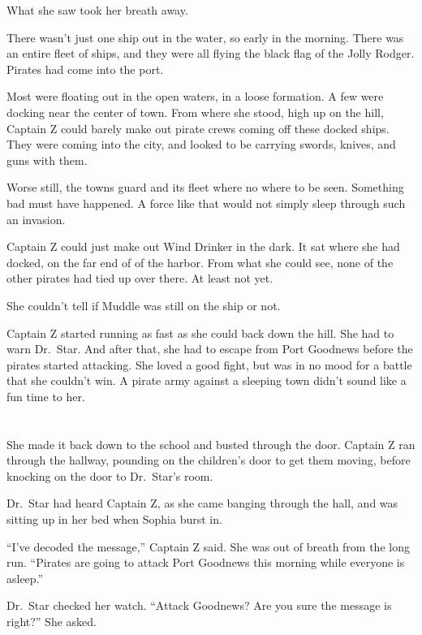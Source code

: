 \documentclass[12pt]{extbook}
\begin{document}
  What she saw took her breath away.
  
  There wasn't just one ship out in the water, so early in the morning.
  There was an entire fleet of ships, and they were all flying the black
  flag of the Jolly Rodger. Pirates had come into the port.
  
  Most were floating out in the open waters, in a loose formation. A few
  were docking near the center of town. From where she stood, high up on
  the hill, Captain Z could barely make out pirate crews coming off these
  docked ships. They were coming into the city, and looked to be carrying
  swords, knives, and guns with them.
  
  Worse still, the towns guard and its fleet where no where to be seen.
  Something bad must have happened. A force like that would not simply
  sleep through such an invasion.
  
  Captain Z could just make out Wind Drinker in the dark. It sat where she
  had docked, on the far end of of the harbor. From what she could see,
  none of the other pirates had tied up over there. At least not yet.
  
  She couldn't tell if Muddle was still on the ship or not.
  
  Captain Z started running as fast as she could back down the hill. She
  had to warn Dr.~Star. And after that, she had to escape from Port
  Goodnews before the pirates started attacking. She loved a good fight,
  but was in no mood for a battle that she couldn't win. A pirate army
  against a sleeping town didn't sound like a fun time to her.
  
  \section{}\label{section-33}
  
  She made it back down to the school and busted through the door. Captain
  Z ran through the hallway, pounding on the children's door to get them
  moving, before knocking on the door to Dr.~Star's room.
  
  Dr.~Star had heard Captain Z, as she came banging through the hall, and
  was sitting up in her bed when Sophia burst in.
  
  \enquote{I've decoded the message,} Captain Z said. She was out of
  breath from the long run. \enquote{Pirates are going to attack Port
  Goodnews this morning while everyone is asleep.}
  
  Dr.~Star checked her watch. \enquote{Attack Goodnews? Are you sure the
  message is right?} She asked.
  
\end{document}
